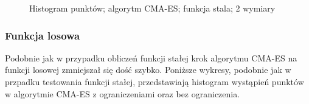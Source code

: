 \documentclass{mini}
\begin{document}
\begin{figure}[H]
\centering
{}
\quad
{}
\caption{Histogram punktów; algorytm CMA-ES; funkcja stala; 2 wymiary}
\end{figure}

\subsubsection*{Funkcja losowa}
Podobnie jak w przypadku obliczeń funkcji stałej krok algorytmu CMA-ES na funkcji losowej zmniejszał się dość szybko. Poniższe wykresy, podobnie jak w przpadku testowania funkcji stałej, przedstawiają histogram wystąpień punktów w algorytmie CMA-ES z ograniczeniami oraz bez ograniczenia.
\end{document}
